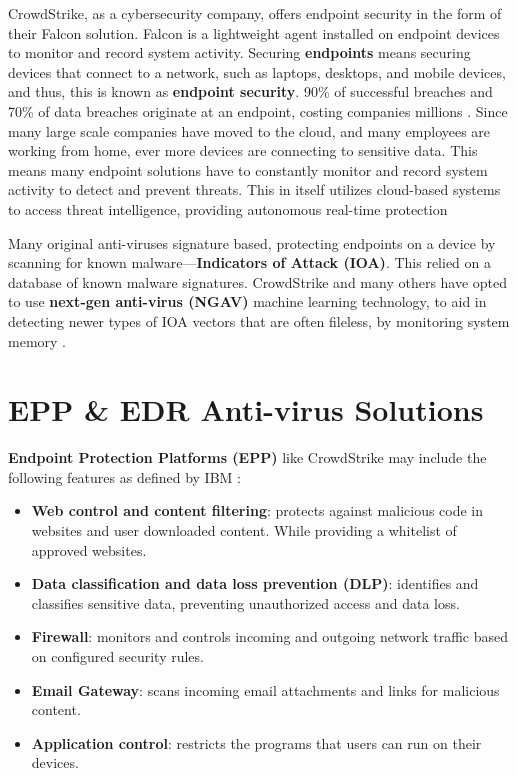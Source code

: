 CrowdStrike, as a cybersecurity company, offers endpoint security in the form of their Falcon solution. Falcon is a lightweight agent installed on endpoint devices to monitor and record system activity.
Securing \textbf{endpoints} means securing devices that connect to a network, such as laptops, desktops, and mobile devices, and thus, this is known as \textbf{endpoint security}.
90\% of successful breaches and 70\% of data breaches originate at an endpoint, costing companies millions \cite{ibm_endpoint_security}.
Since many large scale companies have moved to the cloud, and many employees are working from home, ever more devices are connecting to sensitive data. This means many endpoint solutions
have to constantly monitor and record system activity to detect and prevent threats. This in itself utilizes cloud-based systems to access threat intelligence, providing autonomous
real-time protection \cite{cisco_endpoint_security}

Many original anti-viruses signature based, protecting endpoints on a device by scanning for known malware---\textbf{Indicators of Attack (IOA)}.
This relied on a database of known malware signatures. CrowdStrike and many others
have opted to use \textbf{next-gen anti-virus (NGAV)} machine learning technology,
to aid in detecting newer types of IOA vectors that are often fileless, by monitoring system memory  \cite{ionescu_kernel_access_2024}.

\newpage

\section{EPP \& EDR Anti-virus Solutions}
\textbf{Endpoint Protection Platforms (EPP)} like CrowdStrike may include the following features as defined by IBM \cite{ibm_endpoint_security}:
\begin{itemize}
    \item \textbf{Web control and content filtering}: protects against malicious code in websites and
          user downloaded content. While providing a whitelist of approved websites.
    \item \textbf{Data classification and data loss prevention (DLP)}: identifies and classifies sensitive data,
          preventing unauthorized access and data loss.
    \item \textbf{Firewall}: monitors and controls incoming and outgoing network traffic based on configured security rules.
    \item \textbf{Email Gateway}: scans incoming email attachments and links for malicious content.
    \item \textbf{Application control}: restricts the programs that users can run on their devices.
\end{itemize}


